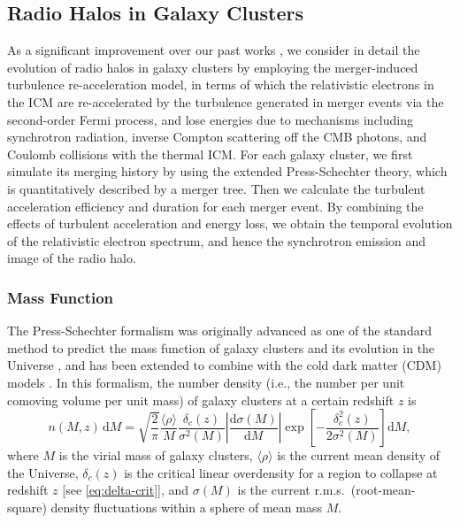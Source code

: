 \documentclass[modern]{aastex62}
\newcommand{\R}[1]{\mathrm{#1}}
\newcommand{\D}[1]{\R{d} #1}
\newcommand{\diff}[2]{\frac{\D{#1}}{\D{#2}}}
\begin{document}
\subsection{Radio Halos in Galaxy Clusters}
\label{sec:cluster-halo}

As a significant improvement over our past works \citep{wang2010,wang2013},
we consider in detail the evolution of radio halos in galaxy clusters
by employing the merger-induced turbulence re-acceleration model,
in terms of which the relativistic electrons in the ICM are re-accelerated
by the turbulence generated in merger events via the second-order
Fermi process,
and lose energies due to mechanisms including synchrotron radiation,
inverse Compton scattering off the CMB photons, and Coulomb collisions
with the thermal ICM.
For each galaxy cluster, we first simulate its merging history
by using the extended Press-Schechter theory,
which is quantitatively described by a merger tree.
Then we calculate the turbulent acceleration efficiency and duration
for each merger event.
By combining the effects of turbulent acceleration and energy loss,
we obtain the temporal evolution of the relativistic electron spectrum,
and hence the synchrotron emission and image of the radio halo.

\subsubsection{Mass Function}
\label{sec:mass-function}

The Press-Schechter formalism was originally advanced as one of the standard
method to predict the mass function of galaxy clusters and its evolution
in the Universe \citep{press1974}, and has been extended to combine with
the cold dark matter (CDM) models \citep[e.g.,][]{bond1991,lacey1993}.
In this formalism, the number density (i.e., the number per unit comoving
volume per unit mass) of galaxy clusters at a certain redshift $z$ is
\begin{equation}
  \label{eq:ps-mass-func}
  n(M, z) \,\D{M} = \sqrt{\frac{2}{\pi}} \frac{\langle{\rho}\rangle}{M}
  \frac{\delta_c(z)}{\sigma^2(M)} \left| \diff{\sigma(M)}{M} \right|
  \exp\!\left[ -\frac{\delta_c^2(z)}{2\sigma^2(M)} \right] \D{M},
\end{equation}
where $M$ is the virial mass of galaxy clusters,
$\langle {\rho} \rangle$ is the current mean density of the Universe,
$\delta_c(z)$ is the critical linear overdensity for a region to collapse
at redshift $z$ [see \autoref{eq:delta-crit}],
and $\sigma(M)$ is the current r.m.s.\ (root-mean-square) density
fluctuations within a sphere of mean mass $M$.
\end{document}
